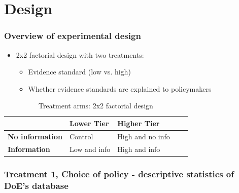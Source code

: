 \documentclass[usenames,dvipsnames]{beamer}
\begin{document}

\section{Design}

\begin{frame}
\frametitle{Overview of experimental design}

\begin{itemize}
\item 2x2 factorial design with two treatments:
\begin{itemize}
\item Evidence standard (low vs. high)
\item Whether evidence standards are explained to policymakers
\end{itemize}
\end{itemize}

\begin{table}[H]
\centering
\caption{Treatment arms: 2x2 factorial design}
\vspace{-7mm}
\label{tab: arms} 
\bigbreak
\begin{tabular}{|l|l|l|l|l|}
\hline
& \textbf{Lower Tier} & \textbf{Higher Tier} \\ \hline
\textbf{No information} & Control & High and no info \\ \hline
\textbf{Information} & Low and info & High and info \\ \hline
\end{tabular}
\end{table}

\end{frame}



\begin{frame}
\frametitle{Treatment 1, Choice of policy - descriptive statistics of DoE's database}


\end{frame}


\end{document}
